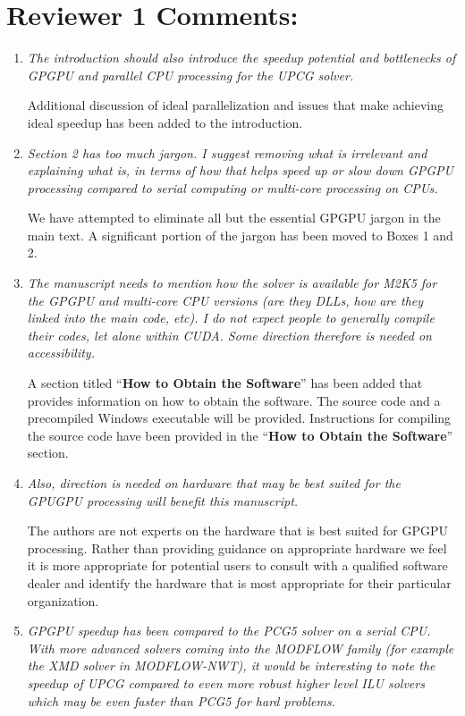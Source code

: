 \documentclass[12pt]{article} %
\begin{document}
\section*{Reviewer 1 Comments:}
\begin{enumerate}
\item \textit{The introduction should also introduce the speedup potential and bottlenecks of GPGPU and parallel CPU processing for the UPCG solver.} 

Additional discussion of ideal parallelization and issues that make achieving ideal speedup has been added to the introduction.

\item \textit{Section 2 has too much jargon. I suggest removing what is irrelevant and explaining what is, in terms of how that helps speed up or slow down GPGPU processing compared to serial computing or multi-core processing on CPUs.} 

We have attempted to eliminate all but the essential GPGPU jargon in the main text.  A significant portion of the jargon has been moved to Boxes 1 and 2.

\item \textit{The manuscript needs to mention how the solver is available for M2K5 for the GPGPU and multi-core CPU versions (are they DLLs, how are they linked into the main code, etc). I do not expect people to generally compile their codes, let alone within CUDA. Some direction therefore is needed on accessibility.} 

A section titled ``\textbf{How to Obtain the Software}'' has been added that provides information on how to obtain the software.  The source code and a precompiled Windows executable will be provided. Instructions for compiling the source code have been provided in the ``\textbf{How to Obtain the Software}''  section.

\item \textit{Also, direction is needed on hardware that may be best suited for the GPUGPU processing will benefit this manuscript.} 

The authors are not experts on the hardware that is best suited for GPGPU processing. Rather than providing guidance on appropriate hardware we feel it is more appropriate for potential users to consult with a qualified software dealer and identify the hardware that is most appropriate for their particular organization.

\item \textit{GPGPU speedup has been compared to the PCG5 solver on a serial CPU. With more advanced solvers coming into the MODFLOW family (for example the XMD solver in MODFLOW-NWT), it would be interesting to note the speedup of UPCG compared to even more robust higher level ILU solvers which may be even faster than PCG5 for hard problems.} 


\end{enumerate}
\end{document}
